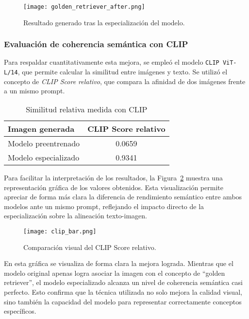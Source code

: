 \begin{figure}[H]
    \centering
    \texttt{[image: golden\_retriever\_after.png]}
    \caption{Resultado generado tras la especialización del modelo.}
    \label{fig:golden-after}
\end{figure}

\subsubsection{Evaluación de coherencia semántica con CLIP}

Para respaldar cuantitativamente esta mejora, se empleó el modelo \texttt{CLIP ViT-L/14}, que permite calcular la similitud entre imágenes y texto. Se utilizó el concepto de \textit{CLIP Score relativo}, que compara la afinidad de dos imágenes frente a un mismo prompt.

\begin{table}[H]
\centering
\renewcommand{\arraystretch}{1.5}
\begin{tabular}{|p{6cm}|c|}
\hline
\rowcolor{gray!30}
\textbf{Imagen generada} & \textbf{CLIP Score relativo} \\
\hline
Modelo preentrenado & 0.0659 \\
\hline
Modelo especializado & 0.9341 \\
\hline
\end{tabular}
\caption{Similitud relativa medida con CLIP}
\label{tab:clip-golden}
\end{table}

Para facilitar la interpretación de los resultados, la Figura~\ref{fig:clip_bar} muestra una representación gráfica de los valores obtenidos. Esta visualización permite apreciar de forma más clara la diferencia de rendimiento semántico entre ambos modelos ante un mismo prompt, reflejando el impacto directo de la especialización sobre la alineación texto-imagen.

\begin{figure}[H]
    \centering
    \texttt{[image: clip\_bar.png]}
    \caption{Comparación visual del CLIP Score relativo.}
    \label{fig:clip_bar}
\end{figure}

En esta gráfica se visualiza de forma clara la mejora lograda. Mientras que el modelo original apenas logra asociar la imagen con el concepto de ``golden retriever'', el modelo especializado alcanza un nivel de coherencia semántica casi perfecto. Esto confirma que la técnica utilizada no solo mejora la calidad visual, sino también la capacidad del modelo para representar correctamente conceptos específicos.

